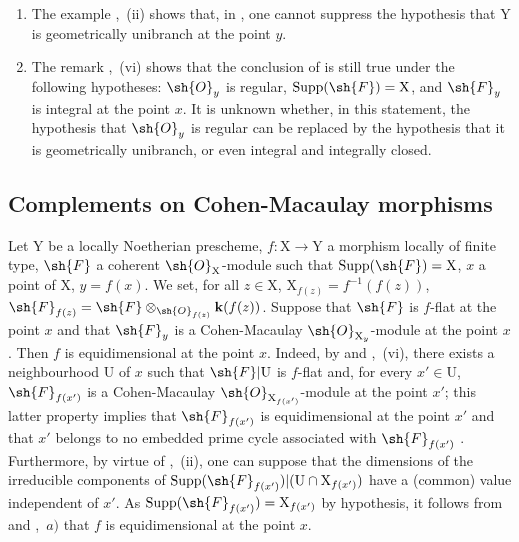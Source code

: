 \begin{remarks}[15.3.4]
\label{IV.15.3.4}
\begin{enumerate}[label=(\roman*)]
  \item The example ,~(ii) shows that, in , one cannot suppress the hypothesis that $\mathrm{Y}$ is geometrically unibranch at the point $y$.
  \item The remark ,~(vi) shows that the conclusion of  is still true under the following hypotheses: $\sh{O}_y$ is regular, $\operatorname{Supp}(\sh{F})=\mathrm{X}$, and $\sh{F}_y$ is integral at the point $x$.
It is unknown whether, in this statement, the hypothesis that $\sh{O}_y$ is regular can be replaced by the hypothesis that it is geometrically unibranch, or even integral and integrally closed.
\end{enumerate}
\end{remarks}

\subsection{Complements on Cohen-Macaulay morphisms}
\label{subsection:IV.15.4}

\begin{proposition}[15.4.1]
\label{IV.15.4.1}
Let $\mathrm{Y}$ be a locally Noetherian prescheme, $f:\mathrm{X}\to\mathrm{Y}$ a morphism locally of finite type, $\sh{F}$ a coherent $\sh{O}_\mathrm{X}$-module such that $\operatorname{Supp}(\sh{F})=\mathrm{X}$, $x$ a point of $\mathrm{X}$, $y=f(x)$.
We set, for all $z\in\mathrm{X}$, $\mathrm{X}_{f(z)}=f^{-1}(f(z))$, $\sh{F}_{f(z)}=\sh{F}\otimes_{\sh{O}_{f(z)}}\mathbf{k}(f(z))$.
Suppose that $\sh{F}$ is $f$-flat at the point $x$ and that $\sh{F}_y$ is a Cohen-Macaulay $\sh{O}_{\mathrm{X}_y}$-module at the point $x$.
Then $f$ is
equidimensional at the point $x$.
Indeed, by  and ,~(vi), there exists a neighbourhood $\mathrm{U}$ of $x$ such that $\sh{F}|\mathrm{U}$ is $f$-flat and, for every $x'\in\mathrm{U}$, $\sh{F}_{f(x')}$ is a Cohen-Macaulay $\sh{O}_{\mathrm{X}_{f(x')}}$-module at the point $x'$; this latter property implies that $\sh{F}_{f(x')}$ is equidimensional at the point $x'$ and that $x'$ belongs to no embedded prime cycle associated with $\sh{F}_{f(x')}$ .
Furthermore, by virtue of ,~(ii), one can suppose that the dimensions of the irreducible components of $\operatorname{Supp}(\sh{F}_{f(x')})|(\mathrm{U}\cap\mathrm{X}_{f(x')})$ have a (common) value independent of $x'$.
As $\operatorname{Supp}(\sh{F}_{f(x')})=\mathrm{X}_{f(x')}$ by hypothesis, it follows from  and ,~$a)$ that $f$ is equidimensional at the point $x$.
\end{proposition}

